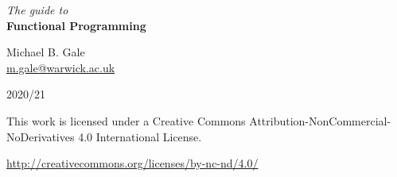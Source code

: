 
\begin{titlepage}
	\begin{center}
		
{\Huge \textit{The guide to}} \\[0.2cm]
{\Huge \textbf{Functional Programming}} \\[0.2cm]

\vfill

\scalebox{25.0}{$\lambda$}

\vfill 

{\LARGE Michael B. Gale} \\[0.1cm]
{\large \href{mailto:m.gale@warwick.ac.uk}{m.gale@warwick.ac.uk}}

\vspace{1cm}

{\Large 2020/21}
\end{center}
\end{titlepage}

\phantom{~}
\vfill

\ccbyncnd

\vspace*{0.2cm}

This work is licensed under a Creative Commons Attribution-NonCommercial-NoDerivatives 4.0 International License. 

\vspace*{0.2cm}

\url{http://creativecommons.org/licenses/by-nc-nd/4.0/}

